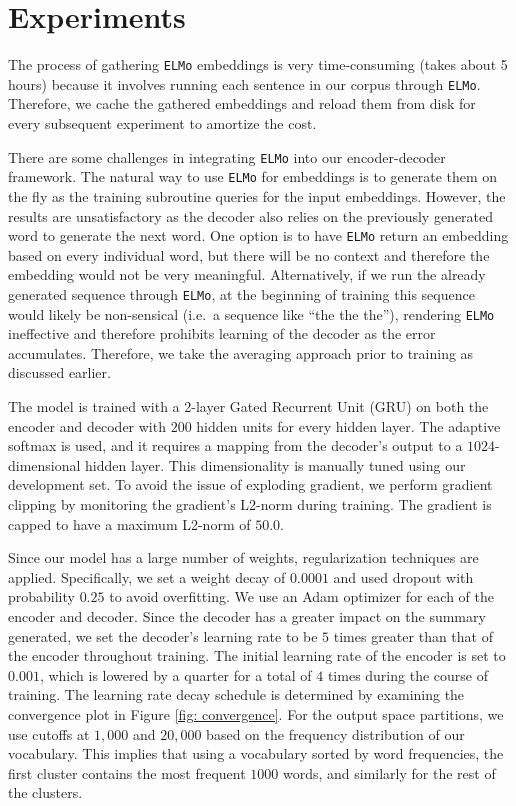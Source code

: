 \section{Experiments}
\label{sec: exp}

The process of gathering \texttt{ELMo} embeddings is very time-consuming (takes about 5 hours) because it involves running each sentence in our corpus through \texttt{ELMo}. Therefore, we cache the gathered embeddings and reload them from disk for every subsequent experiment to amortize the cost. 

There are some challenges in integrating \texttt{ELMo} into our encoder-decoder framework. The natural way to use \texttt{ELMo} for embeddings is to generate them on the fly as the training subroutine queries for the input embeddings. However, the results are unsatisfactory as the decoder also relies on the previously generated word to generate the next word. One option is to have \texttt{ELMo} return an embedding based on every individual word, but there will be no context and therefore the embedding would not be very meaningful. Alternatively, if we run the already generated sequence through \texttt{ELMo}, at the beginning of training this sequence would likely be non-sensical (i.e.\ a sequence like ``the the the''), rendering \texttt{ELMo} ineffective and therefore prohibits learning of the decoder as the error accumulates. Therefore, we take the averaging approach prior to training as discussed earlier.

The model is trained with a 2-layer Gated Recurrent Unit (GRU) on both the encoder and decoder with $200$ hidden units for every hidden layer. The adaptive softmax is used, and it requires a mapping from the decoder's output to a $1024$-dimensional hidden layer. This dimensionality is manually tuned using our development set. To avoid the issue of exploding gradient, we perform gradient clipping by monitoring the gradient's L2-norm during training. The gradient is capped to have a maximum L2-norm of $50.0$.

Since our model has a large number of weights, regularization techniques are applied. Specifically, we set a weight decay of $0.0001$ and used dropout with probability $0.25$ to avoid overfitting. We use an Adam optimizer \cite{kingma2014adam} for each of the encoder and decoder. Since the decoder has a greater impact on the summary generated, we set the decoder's learning rate to be $5$ times greater than that of the encoder throughout training. The initial learning rate of the encoder is set to $0.001$, which is lowered by a quarter for a total of $4$ times during the course of training. The learning rate decay schedule is determined by examining the convergence plot in Figure \ref{fig: convergence}. For the output space partitions, we use cutoffs at $1,000$ and $20,000$ based on the frequency distribution of our vocabulary. This implies that using a vocabulary sorted by word frequencies, the first cluster contains the most frequent $1000$ words, and similarly for the rest of the clusters.

